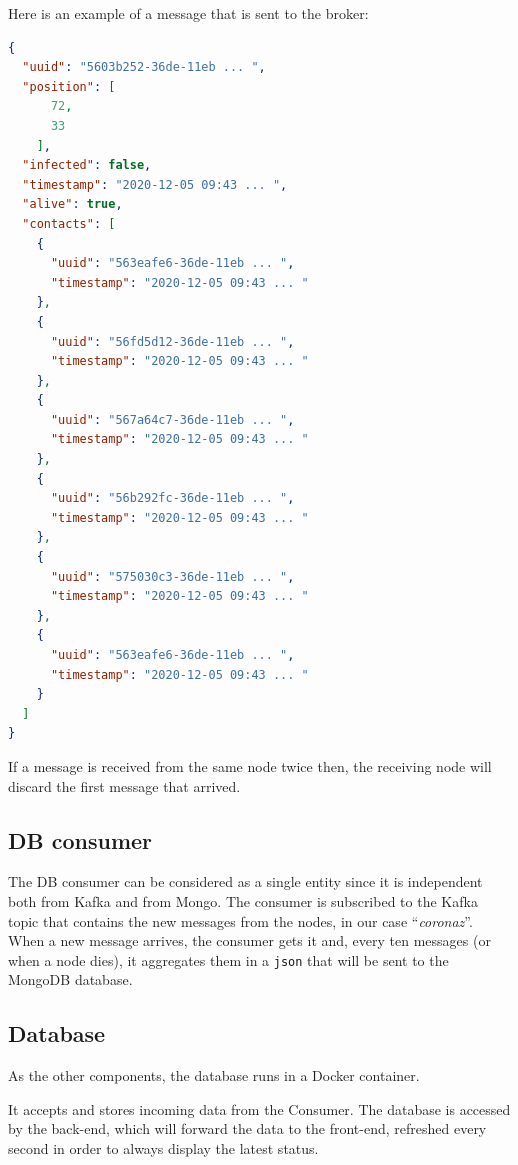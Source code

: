 \documentclass[conference]{IEEEtran}
\begin{document}
		Here is an example of a message that is sent to the broker:
		\begin{lstlisting}[language=json]
{
  "uuid": "5603b252-36de-11eb ... ",
  "position": [
      72,
      33
    ],
  "infected": false,
  "timestamp": "2020-12-05 09:43 ... ",
  "alive": true,
  "contacts": [
    {
      "uuid": "563eafe6-36de-11eb ... ",
      "timestamp": "2020-12-05 09:43 ... "
    },
    {
      "uuid": "56fd5d12-36de-11eb ... ",
      "timestamp": "2020-12-05 09:43 ... "
    },
    {
      "uuid": "567a64c7-36de-11eb ... ",
      "timestamp": "2020-12-05 09:43 ... "
    },
    {
      "uuid": "56b292fc-36de-11eb ... ",
      "timestamp": "2020-12-05 09:43 ... "
    },
    {
      "uuid": "575030c3-36de-11eb ... ",
      "timestamp": "2020-12-05 09:43 ... "
    },
    {
      "uuid": "563eafe6-36de-11eb ... ",
      "timestamp": "2020-12-05 09:43 ... "
    }
  ]
}
		\end{lstlisting}
		
		If a message is received from the same node twice then, the receiving node will discard the first message that arrived.
	
	\subsection{DB consumer}
	
		The DB consumer can be considered as a single entity since it is independent both from Kafka and from Mongo.
		The consumer is subscribed to the Kafka topic that contains the new messages from the nodes, in our case ``\textit{coronaz}''.
		When a new message arrives, the consumer gets it and, every ten messages (or when a node dies), it aggregates them in a \texttt{json} that will be sent to the MongoDB database.
	
	\subsection{Database}
	
		As the other components, the database runs in a Docker container.
		
		It accepts and stores incoming data from the Consumer.
		The database is accessed by the back-end, which will forward the data to the front-end, refreshed every second in order to always display the latest status.
	
\end{document}
